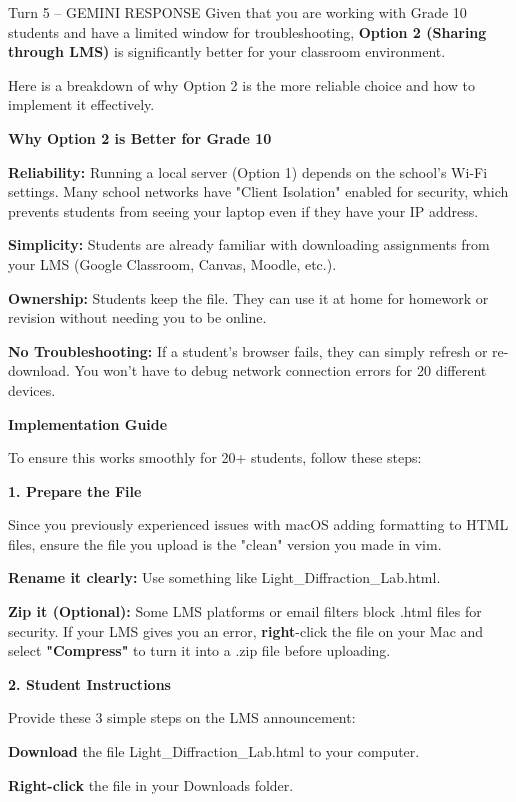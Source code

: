 \documentclass[10pt,a4paper]{article}
\begin{document}
\begin{aibox}{Turn 5 -- GEMINI RESPONSE}
Given that you are working with Grade 10 students and have a limited window for troubleshooting, \textbf{Option 2 (Sharing through LMS)} is significantly better for your classroom environment.

Here is a breakdown of why Option 2 is the more reliable choice and how to implement it effectively.

\textbf{\large Why Option 2 is Better for Grade 10}

\textbf{Reliability:} Running a local server (Option 1) depends on the school’s Wi-Fi settings. Many school networks have "Client Isolation" enabled for security, which prevents students from seeing your laptop even if they have your IP address.

\textbf{Simplicity:} Students are already familiar with downloading assignments from your LMS (Google Classroom, Canvas, Moodle, etc.).

\textbf{Ownership:} Students keep the file. They can use it at home for homework or revision without needing you to be online.

\textbf{No Troubleshooting:} If a student’s browser fails, they can simply refresh or re-download. You won't have to debug network connection errors for 20 different devices.

\textbf{\large Implementation Guide}

To ensure this works smoothly for 20+ students, follow these steps:

\textbf{\large 1. Prepare the File}

Since you previously experienced issues with macOS adding formatting to HTML files, ensure the file you upload is the "clean" version you made in vim.

\textbf{Rename it clearly:} Use something like Light\_Diffraction\_Lab.html.

\textbf{Zip it (Optional):} Some LMS platforms or email filters block .html files for security. If your LMS gives you an error, \textbf{right}-click the file on your Mac and select \textbf{"Compress"} to turn it into a .zip file before uploading.

\textbf{\large 2. Student Instructions}

Provide these 3 simple steps on the LMS announcement:

\textbf{Download} the file Light\_Diffraction\_Lab.html to your computer.

\textbf{Right-click} the file in your Downloads folder.


\end{aibox}
\end{document}
